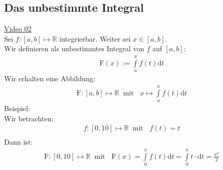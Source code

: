 \subsection{Das unbestimmte Integral}
\href{https://youtu.be/D5fcNNAZP2A}{Video 02}\\
Sei $ f:[a,b]\longmapsto \mathbb{R} $ integrierbar. Weiter sei $ x\in[a,b] $.\\
Wir definieren als unbestimmtes Integral von $ f $ auf $ [a,b] $:\\
\begin{align*}
\mathrm{F}(x):=\int\limits_{a}^{x} f(t)\mathrm{d}t
\end{align*}
Wir erhalten eine Abbildung:\\
\begin{align*}
\mathrm{F}:[a,b]\longmapsto \mathbb{R}\;\;\text{mit }\;\;x\longmapsto \int\limits_{a}^{x} f(t)\mathrm{d}t
\end{align*}
Beispiel:\\
Wir betrachten:\\
\begin{align*}
f:[0,10]\longmapsto \mathbb{R}\;\;\text{mit }\;\; f(t)=t\\
\end{align*}
Dann ist:\\
\begin{align*}
\mathrm{F}:[0,10]\longmapsto \mathbb{R}\;\;\text{mit }\;\; \mathrm{F}(x)=\int\limits_{0}^{x}f(t)\mathrm{d}t=\int\limits_{0}^{x} t\cdot \mathrm{d}t=\frac{x^2}{2}
\end{align*}
